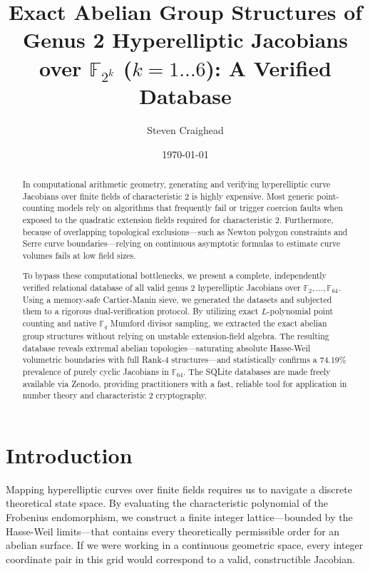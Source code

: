 \documentclass[letterpaper, 11pt]{article}
\title{Exact Abelian Group Structures of Genus 2 Hyperelliptic Jacobians over \texorpdfstring{$\mathbb{F}_{2^k}$}{F\_2\textasciicircum k} (\texorpdfstring{$k=1 \dots 6$}{k=1..6}): A Verified Database}
\author{Steven Craighead}
\date{\today}
\begin{document}
\maketitle

\begin{abstract}
In computational arithmetic geometry, generating and verifying hyperelliptic curve Jacobians over finite fields of characteristic 2 is highly expensive. Most generic point-counting models rely on algorithms that frequently fail or trigger coercion faults when exposed to the quadratic extension fields required for characteristic 2. Furthermore, because of overlapping topological exclusions—such as Newton polygon constraints and Serre curve boundaries—relying on continuous asymptotic formulas to estimate curve volumes fails at low field sizes. 

To bypass these computational bottlenecks, we present a complete, independently verified relational database of all valid genus 2 hyperelliptic Jacobians over $\mathbb{F}_2, \dots, \mathbb{F}_{64}$. Using a memory-safe Cartier-Manin sieve, we generated the datasets and subjected them to a rigorous dual-verification protocol. By utilizing exact $L$-polynomial point counting and native $\mathbb{F}_q$ Mumford divisor sampling, we extracted the exact abelian group structures without relying on unstable extension-field algebra. The resulting database reveals extremal abelian topologies—saturating absolute Hasse-Weil volumetric boundaries with full Rank-4 structures—and statistically confirms a 74.19\% prevalence of purely cyclic Jacobians in $\mathbb{F}_{64}$. The SQLite databases are made freely available via Zenodo, providing practitioners with a fast, reliable tool for application in number theory and characteristic 2 cryptography.
\end{abstract}

\section{Introduction}
Mapping hyperelliptic curves over finite fields requires us to navigate a discrete theoretical state space. By evaluating the characteristic polynomial of the Frobenius endomorphism, we construct a finite integer lattice---bounded by the Hasse-Weil limits---that contains every theoretically permissible order for an abelian surface. If we were working in a continuous geometric space, every integer coordinate pair in this grid would correspond to a valid, constructible Jacobian.
\end{document}
